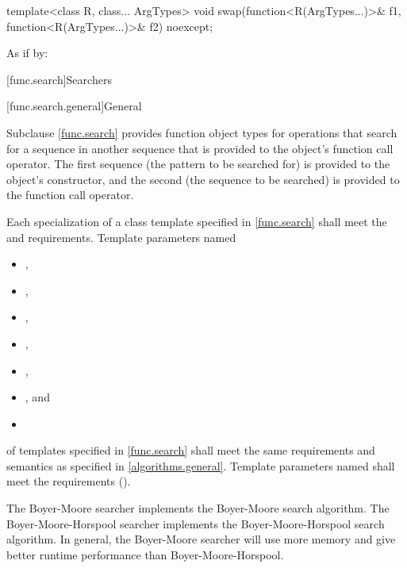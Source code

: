 %
\begin{itemdecl}
template<class R, class... ArgTypes>
  void swap(function<R(ArgTypes...)>& f1, function<R(ArgTypes...)>& f2) noexcept;
\end{itemdecl}

\begin{itemdescr}
\pnum
\effects
As if by: 
\end{itemdescr}%

[func.search]{Searchers}

[func.search.general]{General}

\pnum
Subclause \ref{func.search} provides function object types for
operations that search for a sequence  in another
sequence  that is provided to the object's function call
operator.  The first sequence (the pattern to be searched for) is provided to
the object's constructor, and the second (the sequence to be searched) is
provided to the function call operator.

\pnum
Each specialization of a class template specified in \ref{func.search}
shall meet the  and  requirements.
Template parameters named
\begin{itemize}
\item {},
\item {},
\item {},
\item {},
\item {},
\item {}, and
\item {}
\end{itemize}
of templates specified in
\ref{func.search} shall meet the same requirements and semantics as
specified in \ref{algorithms.general}.
Template parameters named  shall meet the 
requirements ().

\pnum
The Boyer-Moore searcher implements the Boyer-Moore search algorithm.
The Boyer-Moore-Horspool searcher implements the Boyer-Moore-Horspool search algorithm.
In general, the Boyer-Moore searcher will use more memory and give better runtime performance than Boyer-Moore-Horspool.

